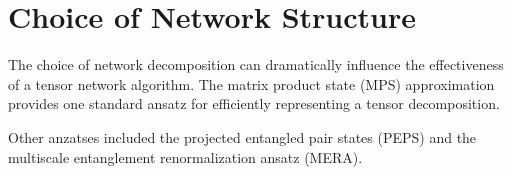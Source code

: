 \documentclass[book.tex]{subfiles}
\begin{document}
\section{Choice of Network Structure}

The choice of network decomposition can dramatically influence the effectiveness of a tensor network algorithm. The matrix product state (MPS) approximation provides one standard ansatz for efficiently representing a tensor decomposition. 


Other anzatses included the projected entangled pair states (PEPS) and the multiscale entanglement renormalization ansatz (MERA). 

\end{document}
